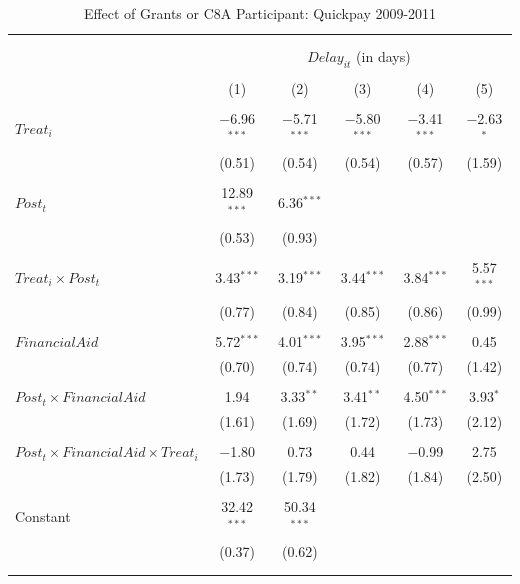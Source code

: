 \documentclass[
]{article}
\begin{document}
\begin{table}[H] \centering 
  \caption{Effect of Grants or C8A Participant: Quickpay 2009-2011} 
  \label{} 
\small 
\begin{tabular}{@{\extracolsep{-2pt}}lccccc} 
\\[-1.8ex]\hline 
\hline \\[-1.8ex] 
\\[-1.8ex] & \multicolumn{5}{c}{$Delay_{it}$ (in days)} \\ 
\\[-1.8ex] & (1) & (2) & (3) & (4) & (5)\\ 
\hline \\[-1.8ex] 
 $Treat_i$ & $-$6.96$^{***}$ & $-$5.71$^{***}$ & $-$5.80$^{***}$ & $-$3.41$^{***}$ & $-$2.63$^{*}$ \\ 
  & (0.51) & (0.54) & (0.54) & (0.57) & (1.59) \\ 
  & & & & & \\ 
 $Post_t$ & 12.89$^{***}$ & 6.36$^{***}$ &  &  &  \\ 
  & (0.53) & (0.93) &  &  &  \\ 
  & & & & & \\ 
 $Treat_i \times Post_t$ & 3.43$^{***}$ & 3.19$^{***}$ & 3.44$^{***}$ & 3.84$^{***}$ & 5.57$^{***}$ \\ 
  & (0.77) & (0.84) & (0.85) & (0.86) & (0.99) \\ 
  & & & & & \\ 
 $FinancialAid$ & 5.72$^{***}$ & 4.01$^{***}$ & 3.95$^{***}$ & 2.88$^{***}$ & 0.45 \\ 
  & (0.70) & (0.74) & (0.74) & (0.77) & (1.42) \\ 
  & & & & & \\ 
 $Post_t \times FinancialAid$ & 1.94 & 3.33$^{**}$ & 3.41$^{**}$ & 4.50$^{***}$ & 3.93$^{*}$ \\ 
  & (1.61) & (1.69) & (1.72) & (1.73) & (2.12) \\ 
  & & & & & \\ 
 $Post_t \times FinancialAid \times Treat_i$ & $-$1.80 & 0.73 & 0.44 & $-$0.99 & 2.75 \\ 
  & (1.73) & (1.79) & (1.82) & (1.84) & (2.50) \\ 
  & & & & & \\ 
 Constant & 32.42$^{***}$ & 50.34$^{***}$ &  &  &  \\ 
  & (0.37) & (0.62) &  &  &  \\ 
  & & & & & \\ 
\hline \\[-1.8ex] 

\end{tabular}
\end{table}
\end{document}
